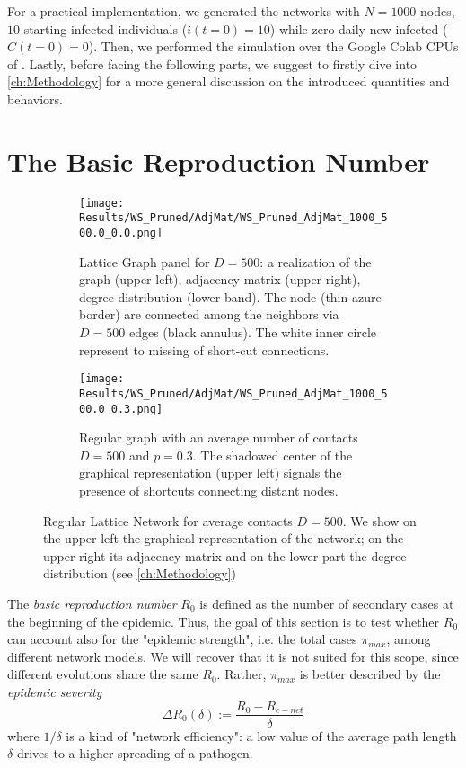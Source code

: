 \documentclass[a4paper,10pt, oneside]{book} %
\theoremstyle{definition}
\begin{document}
For a practical implementation, we generated the networks with $N = 1000$ nodes, $10$ starting infected individuals ($i(t=0) = 10$) while zero daily new infected ($ C(t = 0) = 0$). Then, we performed the simulation over the Google Colab CPUs of \cite{GoogleColab}.
Lastly, before facing the following parts, we suggest to firstly dive into \autoref{ch:Methodology} for a more general discussion on the introduced quantities and behaviors.

\section{The Basic Reproduction Number}
\label{sec:res_RegLat}
\begin{figure}[ht]
	\begin{subfigure}[t]{0.48\linewidth}
		\centering
		\texttt{[image: Results/WS\_Pruned/AdjMat/WS\_Pruned\_AdjMat\_1000\_500.0\_0.0.png]}
		\caption{Lattice Graph panel for $D = 500$: a realization of the graph (upper left), adjacency matrix (upper right), degree distribution (lower band). The node (thin azure border) are connected among the neighbors via $ D = 500$ edges (black annulus). The white inner circle represent to missing of short-cut connections.} 
		\label{fig:net_RegLat_D500}
	\end{subfigure} 
	\hfill
	\begin{subfigure}[t]{0.48\linewidth}
		\centering
		\texttt{[image: Results/WS\_Pruned/AdjMat/WS\_Pruned\_AdjMat\_1000\_500.0\_0.3.png]}
		\caption{Regular graph with an average number of contacts $D = 500$ and $p = 0.3$.
		The shadowed center of the graphical representation (upper left) signals the presence of shortcuts connecting distant nodes.}
		\label{fig:net_RegLat_D500_p0.3}
	\end{subfigure}
	\caption{Regular Lattice Network for average contacts $ D = 500$. We show on the upper left the graphical representation of the network; on the upper right its adjacency matrix and on the lower part the degree distribution (see \autoref{ch:Methodology})}
	\label{fig:net_RegLat}
\end{figure}
The \textit{basic reproduction number} $R_0$ is defined as the number of secondary cases at the beginning of the epidemic. Thus, the goal of this section is to test whether $R_0$ can account also for the "epidemic strength", i.e. the total cases $ \pi_{max}$, among different network models. We will recover that it is not suited for this scope, since different evolutions share the same $ R_0$. 
Rather, $ \pi_{max}$ is better described by the \textit{epidemic severity}  
\begin{equation}
	\Delta R_0(\delta):= \frac{R_0 - R_{c-net}}{\delta}
\end{equation}
where $1/\delta$ is a kind of "network efficiency": a low value of the average path length $ \delta$  drives to a higher spreading of a pathogen.
\end{document}
